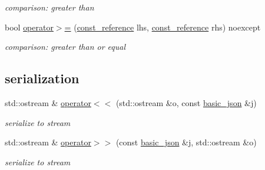 \begin{DoxyCompactItemize}
\begin{DoxyCompactList}\small\item\em comparison\+: greater than \end{DoxyCompactList}\item 
bool \hyperlink{classnlohmann_1_1basic__json_a74a943800c7f103d0990d7eef82c6453}{operator$>$=} (\hyperlink{classnlohmann_1_1basic__json_af677a29b0e66edc9f66e5167e4667071}{const\+\_\+reference} lhs, \hyperlink{classnlohmann_1_1basic__json_af677a29b0e66edc9f66e5167e4667071}{const\+\_\+reference} rhs) noexcept
\begin{DoxyCompactList}\small\item\em comparison\+: greater than or equal \end{DoxyCompactList}\end{DoxyCompactItemize}
\subsection*{serialization}
\begin{DoxyCompactItemize}
\item 
std\+::ostream \& \hyperlink{classnlohmann_1_1basic__json_a5e34c5435e557d0bf666bd7311211405}{operator$<$$<$} (std\+::ostream \&o, const \hyperlink{classnlohmann_1_1basic__json}{basic\+\_\+json} \&j)
\begin{DoxyCompactList}\small\item\em serialize to stream \end{DoxyCompactList}\item 
std\+::ostream \& \hyperlink{classnlohmann_1_1basic__json_a34d6a60dd99e9f33b8273a1c8db5669b}{operator$>$$>$} (const \hyperlink{classnlohmann_1_1basic__json}{basic\+\_\+json} \&j, std\+::ostream \&o)
\begin{DoxyCompactList}\small\item\em serialize to stream \end{DoxyCompactList}\end{DoxyCompactItemize}
